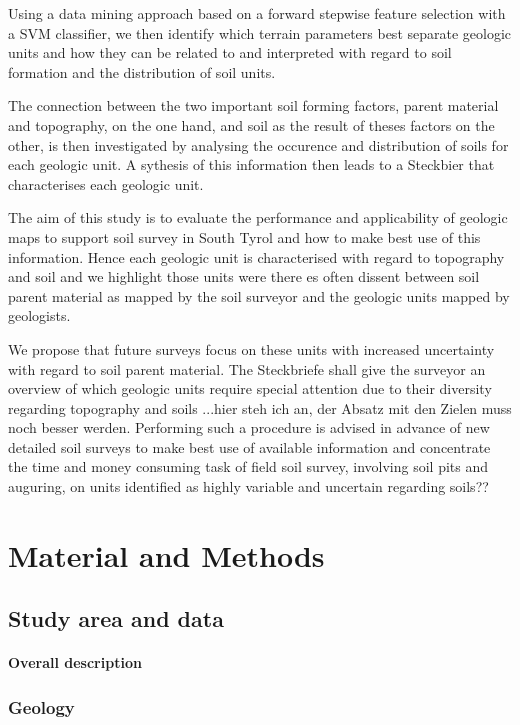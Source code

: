 \documentclass[preprint,12pt,authoryear]{elsarticle}
\begin{document}
Using a data mining approach based on a forward stepwise feature selection with a SVM classifier, we then identify which terrain parameters best separate geologic units and how they can be related to and interpreted with regard to soil formation and the distribution of soil units.

The connection between the two important soil forming factors, parent material and topography, on the one hand, and soil as the result of theses factors on the other, is then investigated by analysing the occurence and distribution of soils for each geologic unit. A sythesis of this information then leads to a Steckbier that characterises each geologic unit. 

The aim of this study is to evaluate the performance and applicability of geologic maps to support soil survey in South Tyrol and how to make best use of this information. Hence each geologic unit is characterised with regard to topography and soil and we highlight those units were there es often dissent between soil parent material as mapped by the soil surveyor and the geologic units mapped by geologists.

 We propose that future surveys focus on these units with increased uncertainty with regard to soil parent material. The Steckbriefe shall give the surveyor an overview of which geologic units require special attention due to their diversity regarding topography and soils ...hier steh ich an, der Absatz mit den Zielen muss noch besser werden. Performing such a procedure is advised in advance of new detailed soil surveys to make best use of available information and concentrate the time and money consuming task of field soil survey, involving soil pits and auguring, on units identified as   highly variable and uncertain regarding soils?? 




\section{Material and Methods}
\subsection{Study area and data}
\paragraph{Overall description}
\subsubsection{Geology}
\end{document}
